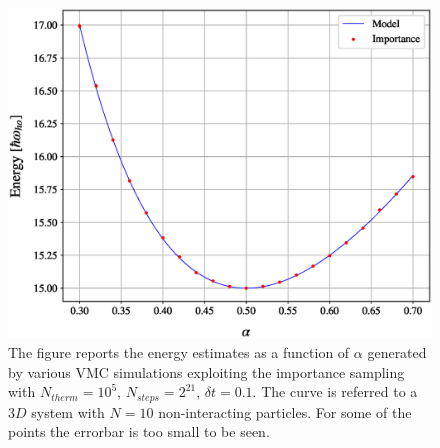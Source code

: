 \begin{figure}[H]
    \includegraphics[scale=0.37]{images/varying_alpha_noninteract_importance.eps}
    \caption{The figure reports the energy estimates as a function of $\alpha$ generated by various VMC simulations exploiting the importance sampling with $N_{therm}=10^5$, $N_{steps}=2^{21}$, $\delta t = 0.1$. The curve is referred to a $3D$ system with $N=10$ non-interacting particles. For some of the points the errorbar is too small to be seen. }
    \label{fig:varying_alpha_noninteract_importance}
\end{figure}


